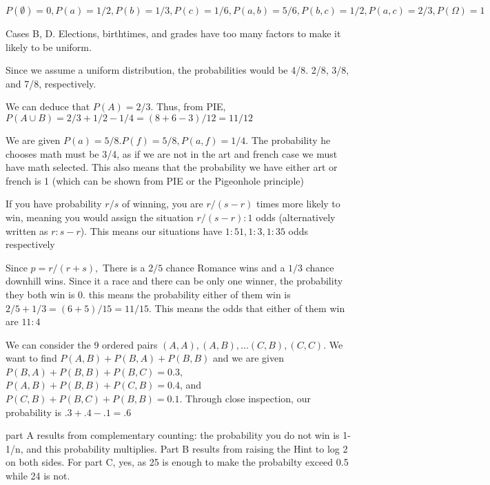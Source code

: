 \begin{oddenumerate}
	\item $ P(\emptyset) = 0, P({a}) = 1/2, P({b}) = 1/3, P({c}) = 1/6, P({a,b}) = 5/6, P({b,c}) = 1/2, P(a,c) = 2/3, P(\Omega) = 1$
	
	\item Cases B, D. Elections, birthtimes, and grades have too many factors to make it likely to be uniform.
	
	\item Since we assume a uniform distribution, the probabilities would be 4/8. 2/8, 3/8, and 7/8, respectively.
	
	\item We can deduce that $ P(A) = 2/3 $. Thus, from PIE, $ P(A \cup B)  = 2/3 + 1/2 - 1/4 = (8+6-3)/12 = 11/12$
	
	\item We are given $ P(a) =5/8. P(f) = 5/8, P(a,f) = 1/4. $ The probability he chooses math must be 3/4, as if we are not in the art and french case we must have math selected. This also means that the probability we have either art or french is 1 (which can be shown from PIE or the Pigeonhole principle)
	
	\item If you have probability $ r/s $ of winning, you are $ r/(s-r) $ times more likely to win, meaning you would assign the situation $ r/(s-r) : 1 $ odds (alternatively written as $ r: s-r $). This means our situations have $ 1:51, 1:3, 1:35 $ odds respectively
	
	\item Since $ p = r/(r+s), $ There is a $ 2/5 $ chance Romance wins and a $ 1/3 $ chance downhill wins. Since it a race and there can be only one winner, the probability they both win is 0. this means the probability either of them win is $ 2/5 + 1/3 = (6+5)/15 = 11/15 $. This means the odds that either of them win are $ 11:4 $
	
	\item We can consider the 9 ordered pairs $ (A,A), (A,B), ... (C,B), (C,C) $. We want to find $ P(A,B) +P(B, A) + P(B,B) $ and we are given $ P(B,A) +   P(B,B) +   P(B,C) = 0.3$, $ P(A,B) + P(B,B) + P(C,B) = 0.4$, and $ P(C,B) +P(B, C) + P(B,B) = 0.1 $. Through close inspection, our probability is $ .3 + .4 - .1 = .6 $
	
	\item part A results from complementary counting: the probability you do not win is 1-1/n, and this probability multiplies. Part B results from raising the Hint to log 2 on both sides. For part C, yes, as 25 is enough to make the probabilty exceed 0.5 while 24 is not.
	

\end{oddenumerate}
